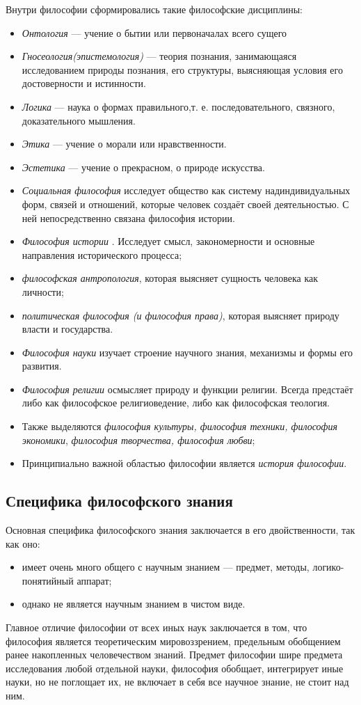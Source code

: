 \documentclass[12pt]{article}
\begin{document}
Внутри философии сформировались такие философские дисциплины:
\begin{itemize}
\item \textit{Онтология} --- учение о бытии или первоначалах всего сущего
\item \textit{Гносеология(эпистемология)} --- теория познания, занимающаяся исследованием природы познания,
	его структуры, выясняющая условия его достоверности и истинности.
\item \textit{Логика} --- наука о формах правильного,т. е. последовательного, связного, доказательного мышления.
\item \textit{Этика} --- учение о морали или нравственности.
\item \textit{Эстетика} --- учение о прекрасном, о природе искусства.
\item \textit{Социальная философия} исследует общество как систему надиндивидуальных форм, связей и отношений,
	которые человек создаёт своей деятельностью.
	С ней непосредственно связана философия истории.
\item \textit{Философия истории}	. Исследует смысл, закономерности и основные направления исторического процесса;
\item \textit{философская антропология}, которая выясняет сущность человека как личности;
\item \textit{политическая философия (и философия права)}, которая выясняет природу власти и государства.
\item \textit{Философия науки} изучает строение научного знания, механизмы и формы его развития.
\item \textit{Философия религии} осмысляет природу и функции религии.
	Всегда предстаёт либо как философское религиоведение, либо как философская теология.
\item Также выделяются \textit{философия культуры, философия техники, философия экономики},
	\textit{философия творчества, философия любви};
\item Принципиально важной областью философии является \textit{история философии}.
\end{itemize}

\subsection{Специфика философского знания}
Основная специфика философского знания заключается в его двойственности, так как оно:
\begin{itemize}
\item имеет очень много общего с научным знанием — предмет, методы, логико-понятийный аппарат;
\item однако не является научным знанием в чистом виде.
\end{itemize}
Главное отличие философии от всех иных наук заключается в том, что философия является теоретическим
мировоззрением, предельным обобщением ранее накопленных человечеством знаний.
Предмет философии шире предмета исследования любой отдельной науки, философия обобщает, интегрирует
иные науки, но не поглощает их, не включает в себя все научное знание, не стоит над ним.
\end{document}
